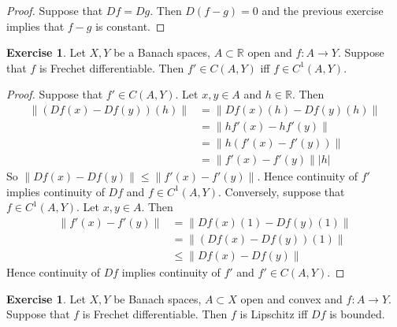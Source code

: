 \documentclass[12pt]{amsart}
\theoremstyle{definition}
\newtheorem{ex}[definition]{Exercise}
\newcommand{\R}{\mathbb{R}}
\DeclareMathOperator*{\0}{\mbf{0}}
\DeclareMathOperator*{\1}{\mbf{1}}
\newcommand{\lex}[1]{\label{ex:#1}}
\begin{document}
	\begin{proof}
		Suppose that $Df = Dg$. Then $D(f-g) = 0$ and the previous exercise implies that $f -g$ is constant.
	\end{proof}		
	
	\begin{ex} \lex{64006}
	Let $X, Y$ be a Banach spaces, $A \subset \R$ open and $f:A \rightarrow Y$. Suppose that $f$ is Frechet differentiable. Then $f' \in C(A,Y)$ iff $f \in C^1(A,Y)$.
	\end{ex}
	
	\begin{proof}
	Suppose that $f' \in C(A, Y)$. Let $x,y \in A$ and $h \in \R$. Then 
	\begin{align*}
	\|(Df(x)- Df(y))(h)\| 
	&= \|Df(x)(h) - Df(y)(h)\| \\
	&=  \|hf'(x) - hf'(y)\| \\
	&= \|h(f'(x) - f'(y))\| \\
	&= \|f'(x) - f'(y)\||h|
	\end{align*}
	So $\|Df(x) - Df(y)\| \leq \|f'(x) - f'(y)\|$. Hence continuity of $f'$ implies continuity of $Df$ and $f \in C^1(A, Y)$.
	Conversely, suppose that $f \in C^1(A, Y)$. Let $x,y \in A$. Then 
	\begin{align*}
	\|f'(x) - f'(y)\| 
	&= \|Df(x)(1) - Df(y)(1)\| \\
	&= \|(Df(x) - Df(y))(1)\| \\
	& \leq \| Df(x) - Df(y)\|
	\end{align*}
	Hence continuity of $Df$ implies continuity of $f'$ and $f' \in C(A, Y)$.
	\end{proof}

	\begin{ex}
		Let $X,Y$ be Banach spaces, $A \subset X$ open and convex and $f:A \rightarrow Y$. Suppose that $f$ is Frechet differentiable. Then $f$ is Lipschitz iff $Df$ is bounded.
	\end{ex}
\end{document}
